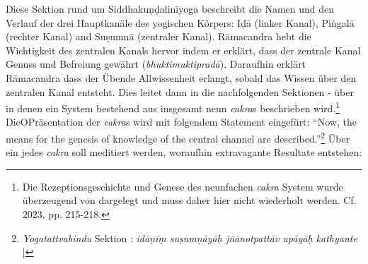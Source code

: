 Diese Sektion rund um Siddhakuṇḍalinīyoga beschreibt die Namen und den Verlauf der drei Hauptkanäle des yogischen Körpers: Iḍā (linker Kanal), Piṅgalā (rechter Kanal) and Suṣumnā (zentraler Kanal). Rāmacandra hebt die Wichtigkeit des zentralen Kanals hervor indem er erklärt, dass der zentrale Kanal Genuss und Befreiung gewährt (\textit{bhuktimuktipradā}). Daraufhin erklärt Rāmacandra dass der Übende Allwissenheit erlangt, sobald das Wissen über den zentralen Kanal entsteht. Dies leitet dann in die nachfolgenden Sektionen - über in denen ein System bestehend aus insgesamt neun \textit{cakra}s beschrieben wird.\footnote{Die Rezeptionsgeschichte und Genese des neunfachen \textit{cakra} System wurde überzeugend von \citeauthor{powell2023} dargelegt und muss daher hier nicht wiederholt werden. Cf. \citeauthor{powell2023} 2023, pp. 215-218.} DieOPräsentation der \textit{cakra}s wird mit folgendem Statement eingefürt: ``Now, the means for the genesis of knowledge of the central channel are described.''\footnote{\emph{Yogatattvabindu} Sektion : \textit{idāṇīṃ suṣumṇāyāḥ jñānotpattāv upāyāḥ kathyante} |} Über ein jedes \textit{cakra} soll meditiert werden, woraufhin extravagante Resultate entstehen:
\newpage 
\footnotesize
